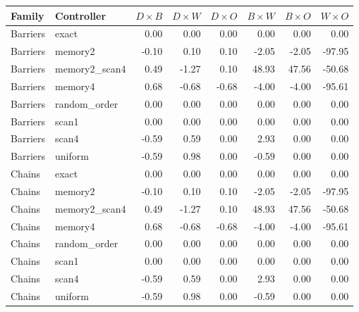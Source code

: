 \begin{tabular}{llrrrrrr}
\toprule
Family & Controller & $D\times{} B$ & $D\times{} W$ & $D\times{} O$ & $B\times{} W$ & $B\times{} O$ & $W\times{} O$\\
\midrule
Barriers & exact & 0.00 & 0.00 & 0.00 & 0.00 & 0.00 & 0.00\\
Barriers & memory2 & -0.10 & 0.10 & 0.10 & -2.05 & -2.05 & -97.95\\
Barriers & memory2\_scan4 & 0.49 & -1.27 & 0.10 & 48.93 & 47.56 & -50.68\\
Barriers & memory4 & 0.68 & -0.68 & -0.68 & -4.00 & -4.00 & -95.61\\
Barriers & random\_order & 0.00 & 0.00 & 0.00 & 0.00 & 0.00 & 0.00\\
Barriers & scan1 & 0.00 & 0.00 & 0.00 & 0.00 & 0.00 & 0.00\\
Barriers & scan4 & -0.59 & 0.59 & 0.00 & 2.93 & 0.00 & 0.00\\
Barriers & uniform & -0.59 & 0.98 & 0.00 & -0.59 & 0.00 & 0.00\\
Chains & exact & 0.00 & 0.00 & 0.00 & 0.00 & 0.00 & 0.00\\
Chains & memory2 & -0.10 & 0.10 & 0.10 & -2.05 & -2.05 & -97.95\\
Chains & memory2\_scan4 & 0.49 & -1.27 & 0.10 & 48.93 & 47.56 & -50.68\\
Chains & memory4 & 0.68 & -0.68 & -0.68 & -4.00 & -4.00 & -95.61\\
Chains & random\_order & 0.00 & 0.00 & 0.00 & 0.00 & 0.00 & 0.00\\
Chains & scan1 & 0.00 & 0.00 & 0.00 & 0.00 & 0.00 & 0.00\\
Chains & scan4 & -0.59 & 0.59 & 0.00 & 2.93 & 0.00 & 0.00\\
Chains & uniform & -0.59 & 0.98 & 0.00 & -0.59 & 0.00 & 0.00\\
\bottomrule
\end{tabular}